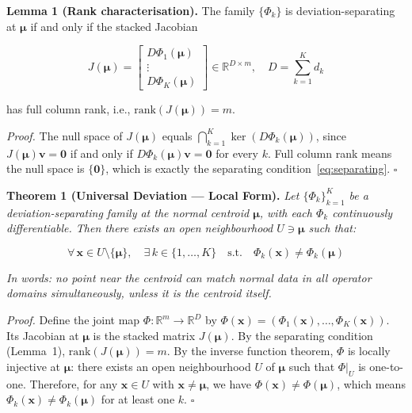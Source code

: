 \documentclass[journal]{IEEEtran}
\newcommand{\R}{\mathbb{R}}
\begin{document}
\vspace{0.5em}

\textbf{Lemma 1 (Rank characterisation).} The family $\{\Phi_k\}$ is deviation-separating at $\boldsymbol{\mu}$ if and only if the stacked Jacobian

\begin{equation}
J(\boldsymbol{\mu}) = \begin{bmatrix} D\Phi_1(\boldsymbol{\mu}) \\ \vdots \\ D\Phi_K(\boldsymbol{\mu}) \end{bmatrix} \in \R^{D \times m}, \quad D = \textstyle\sum_{k=1}^K d_k
\label{eq:stacked_jacobian}
\end{equation}

has full column rank, i.e., $\text{rank}(J(\boldsymbol{\mu})) = m$.

\textit{Proof.} The null space of $J(\boldsymbol{\mu})$ equals $\bigcap_{k=1}^K \ker(D\Phi_k(\boldsymbol{\mu}))$, since $J(\boldsymbol{\mu})\mathbf{v} = \mathbf{0}$ if and only if $D\Phi_k(\boldsymbol{\mu})\mathbf{v} = \mathbf{0}$ for every $k$. Full column rank means the null space is $\{\mathbf{0}\}$, which is exactly the separating condition~\eqref{eq:separating}. $\square$

\vspace{0.5em}

\textbf{Theorem 1 (Universal Deviation --- Local Form).} \textit{Let $\{\Phi_k\}_{k=1}^K$ be a deviation-separating family at the normal centroid $\boldsymbol{\mu}$, with each $\Phi_k$ continuously differentiable. Then there exists an open neighbourhood $U \ni \boldsymbol{\mu}$ such that:}

\begin{equation}
\forall\, \mathbf{x} \in U \setminus \{\boldsymbol{\mu}\},\quad \exists\, k \in \{1,\ldots,K\} \quad\text{s.t.}\quad \Phi_k(\mathbf{x}) \neq \Phi_k(\boldsymbol{\mu})
\label{eq:theorem_local}
\end{equation}

\textit{In words: no point near the centroid can match normal data in all operator domains simultaneously, unless it is the centroid itself.}

\textit{Proof.} Define the joint map $\Phi: \R^m \to \R^D$ by $\Phi(\mathbf{x}) = (\Phi_1(\mathbf{x}), \ldots, \Phi_K(\mathbf{x}))$. Its Jacobian at $\boldsymbol{\mu}$ is the stacked matrix $J(\boldsymbol{\mu})$. By the separating condition (Lemma~1), $\text{rank}(J(\boldsymbol{\mu})) = m$. By the inverse function theorem, $\Phi$ is locally injective at $\boldsymbol{\mu}$: there exists an open neighbourhood $U$ of $\boldsymbol{\mu}$ such that $\Phi|_U$ is one-to-one. Therefore, for any $\mathbf{x} \in U$ with $\mathbf{x} \neq \boldsymbol{\mu}$, we have $\Phi(\mathbf{x}) \neq \Phi(\boldsymbol{\mu})$, which means $\Phi_k(\mathbf{x}) \neq \Phi_k(\boldsymbol{\mu})$ for at least one $k$. $\square$
\end{document}
